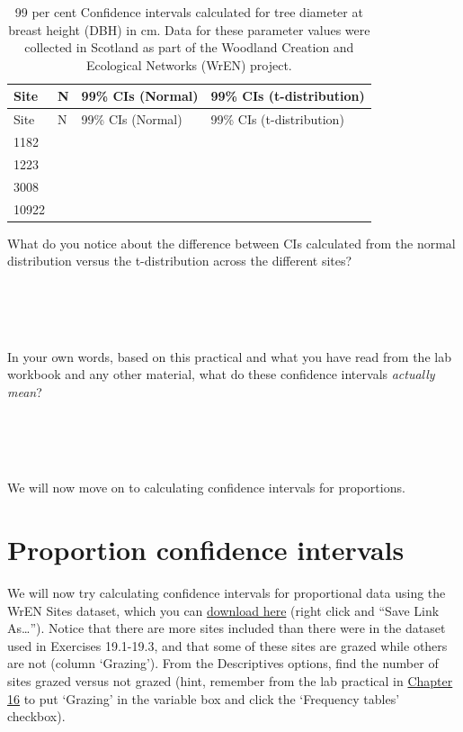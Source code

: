 \documentclass[
]{scrbook}
\begin{document}
\begin{longtable}[]{@{}llll@{}}
\caption{99 per cent Confidence intervals calculated for tree diameter at breast height (DBH) in cm. Data for these parameter values were collected in Scotland as part of the Woodland Creation and Ecological Networks (WrEN) project.}\tabularnewline
\toprule
Site & N & 99\% CIs (Normal) & 99\% CIs (t-distribution) \\
\midrule
\endfirsthead
\toprule
Site & N & 99\% CIs (Normal) & 99\% CIs (t-distribution) \\
\midrule
\endhead
1182 & & & \\
1223 & & & \\
3008 & & & \\
10922 & & & \\
\bottomrule
\end{longtable}

What do you notice about the difference between CIs calculated from the normal distribution versus the t-distribution across the different sites?

\begin{verbatim}




\end{verbatim}

In your own words, based on this practical and what you have read from the lab workbook and any other material, what do these confidence intervals \emph{actually mean}?

\begin{verbatim}




\end{verbatim}

We will now move on to calculating confidence intervals for proportions.

\hypertarget{proportion-confidence-intervals}{%
\section{Proportion confidence intervals}\label{proportion-confidence-intervals}}

We will now try calculating confidence intervals for proportional data using the WrEN Sites dataset, which you can \href{https://raw.githubusercontent.com/bradduthie/SCIU4T4/main/data/wren_sites.csv}{download here} (right click and ``Save Link As\ldots{}'').
Notice that there are more sites included than there were in the dataset used in Exercises 19.1-19.3, and that some of these sites are grazed while others are not (column `Grazing').
From the Descriptives options, find the number of sites grazed versus not grazed (hint, remember from the lab practical in \protect\hyperlink{Chapter_16}{Chapter 16} to put `Grazing' in the variable box and click the `Frequency tables' checkbox).
\end{document}
